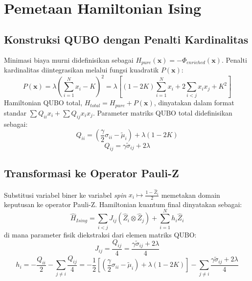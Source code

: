 \section{Pemetaan Hamiltonian Ising}

\subsection{Konstruksi QUBO dengan Penalti Kardinalitas}
Minimasi biaya murni didefinisikan sebagai $H_{pure}(\mathbf{x}) = -\Phi_{enriched}(\mathbf{x})$. Penalti kardinalitas diintegrasikan melalui fungsi kuadratik $P(\mathbf{x})$:
\begin{equation}
    P(\mathbf{x}) = \lambda \left( \sum_{i=1}^N x_i - K \right)^2 = \lambda \left[ (1 - 2K) \sum_{i=1}^N x_i + 2 \sum_{i < j} x_i x_j + K^2 \right]
\end{equation}
Hamiltonian QUBO total, $H_{total} = H_{pure} + P(\mathbf{x})$, dinyatakan dalam format standar $\sum Q_{ii} x_i + \sum Q_{ij} x_i x_j$. Parameter matriks QUBO total didefinisikan sebagai:
\begin{equation}
    Q_{ii} = \left( \frac{\gamma}{2} \sigma_{ii} - \tilde{\mu}_i \right) + \lambda(1 - 2K)
\end{equation}
\begin{equation}
    Q_{ij} = \gamma \tilde{\sigma}_{ij} + 2\lambda
\end{equation}

\subsection{Transformasi ke Operator Pauli-Z}
Substitusi variabel biner ke variabel \textit{spin} $x_i \mapsto \frac{1 - \hat{Z}_i}{2}$ memetakan domain keputusan ke operator Pauli-Z. Hamiltonian kuantum final dinyatakan sebagai:
\begin{equation}
    \hat{H}_{Ising} = \sum_{i < j} J_{ij} (\hat{Z}_i \otimes \hat{Z}_j) + \sum_{i=1}^N h_i \hat{Z}_i
\end{equation}
di mana parameter fisik diekstraksi dari elemen matriks QUBO:
\begin{equation}
    J_{ij} = \frac{Q_{ij}}{4} = \frac{\gamma \tilde{\sigma}_{ij} + 2\lambda}{4}
\end{equation}
\begin{equation}
    h_i = -\frac{Q_{ii}}{2} - \sum_{j \neq i} \frac{Q_{ij}}{4} = -\frac{1}{2} \left[ \left( \frac{\gamma}{2} \sigma_{ii} - \tilde{\mu}_i \right) + \lambda(1 - 2K) \right] - \sum_{j \neq i} \frac{\gamma \tilde{\sigma}_{ij} + 2\lambda}{4}
\end{equation}
